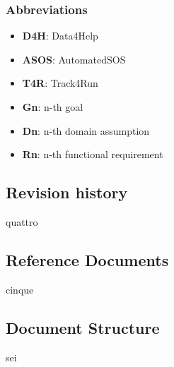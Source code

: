 \subsubsection{Abbreviations}
\begin{itemize}
\item \textbf{D4H}: Data4Help
\item \textbf{ASOS}: AutomatedSOS
\item \textbf{T4R}: Track4Run
\item \textbf{Gn}: n-th goal
\item \textbf{Dn}: n-th domain assumption
\item \textbf{Rn}: n-th functional requirement
\end{itemize}
\subsection{Revision history}
quattro
\subsection{Reference Documents}
cinque
\subsection{Document Structure}
sei
